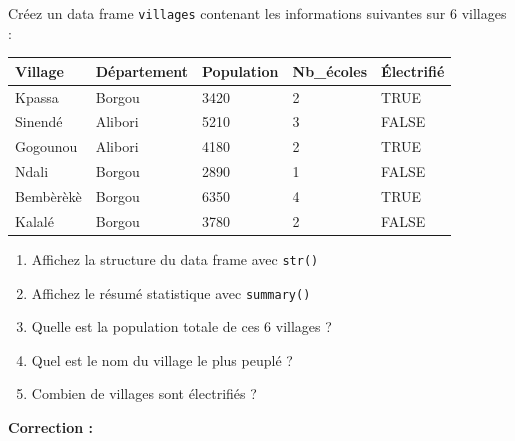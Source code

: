 \documentclass[
  french,
  11pt,
  a4paper,
]{article}
\newcounter{none} %
\providecommand{\tightlist}{%
  \setlength{\itemsep}{0pt}\setlength{\parskip}{0pt}}
\begin{document}
\begin{tcolorbox}[enhanced jigsaw, arc=.35mm, bottomrule=.15mm, bottomtitle=1mm, breakable, colback=white, colbacktitle=quarto-callout-caution-color!10!white, colframe=quarto-callout-caution-color-frame, coltitle=black, left=2mm, leftrule=.75mm, opacityback=0, opacitybacktitle=0.6, rightrule=.15mm, title=\textcolor{quarto-callout-caution-color}{\faFire}\hspace{0.5em}{Exercice 5 --- Data frames}, titlerule=0mm, toprule=.15mm, toptitle=1mm]

Créez un data frame \texttt{villages} contenant les informations
suivantes sur 6 villages :

{\def\LTcaptype{none} %
\begin{longtable}[]{@{}lllll@{}}
\toprule\noalign{}
Village & Département & Population & Nb\_écoles & Électrifié \\
\midrule\noalign{}
\endhead
\bottomrule\noalign{}
\endlastfoot
Kpassa & Borgou & 3420 & 2 & TRUE \\
Sinendé & Alibori & 5210 & 3 & FALSE \\
Gogounou & Alibori & 4180 & 2 & TRUE \\
Ndali & Borgou & 2890 & 1 & FALSE \\
Bembèrèkè & Borgou & 6350 & 4 & TRUE \\
Kalalé & Borgou & 3780 & 2 & FALSE \\
\end{longtable}
}

\begin{enumerate}
\def\labelenumi{\arabic{enumi}.}
\tightlist
\item
  Affichez la structure du data frame avec \texttt{str()}
\item
  Affichez le résumé statistique avec \texttt{summary()}
\item
  Quelle est la population totale de ces 6 villages ?
\item
  Quel est le nom du village le plus peuplé ?
\item
  Combien de villages sont électrifiés ?
\end{enumerate}

\end{tcolorbox}

\textbf{Correction :}
\end{document}
